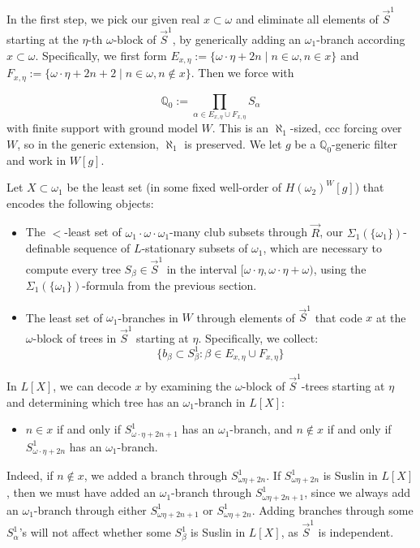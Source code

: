 \documentclass[a4paper,11pt]{article}
\newcommand{\forceQ}{\mathbb{Q}}
\begin{document}
{In the first step, we pick our given real $x \subset \omega$ and eliminate all elements of \(\vec{S}^1\) starting at the $\eta$-th $\omega$-block of \( \vec{S}^1 \), by generically adding an \(\omega_1\)-branch according  $x\subset \omega$. Specifically, we first form \(E_{x,\eta}:= \{ \omega \cdot \eta +2n \mid n \in \omega, n \in x \} \) and
\( F_{x,\eta} := \{ \omega \cdot \eta+2n+2 \mid n \in \omega, n \notin x \} \). Then we force with


 \[\forceQ_0:= \prod_{\alpha  \in E_{x,\eta} \cup F_{x,\eta}} S_{\alpha}\] with finite support with ground model \(W\). This is an \(\aleph_1\)-sized, ccc forcing over \(W\), so in the generic extension, \(\aleph_1\) is preserved. We let $g$ be a $\forceQ_0$-generic filter and work in $W[g]$.

 
Let \(X \subset \omega_1\) be the least set (in some fixed well-order of \(H(\omega_2)^W[g]\)) that encodes the following objects:
\begin{itemize}

\item  The $<$-least set of $\omega_1 \cdot \omega \cdot \omega_1$-many club subsets through $\vec{R}$, our $\Sigma_1 (\{\omega_1\})$-definable sequence of $L$-stationary subsets of $\omega_1$, which are necessary to compute every tree $S_{\beta} \in \vec{S}^1$ in the interval $[ \omega \cdot \eta, \omega\cdot \eta + \omega)$, using the $\Sigma_1 (\{\omega_1\})$-formula from the previous section.


\item The least set of \(\omega_1\)-branches in \(W\) through elements of \(\vec{S}^1\) that code \( x\) at the \(\omega\)-block of trees in $\vec{S}^1$ starting at  \( \eta \). Specifically, we collect:
\[
\{ b_{\beta} \subset S^1_{\beta} : \beta \in E_{x,\eta} \cup F_{x,\eta} \}
\]

\end{itemize}


In \(L[X]\),  we can decode \(x \) by examining the \(\omega\)-block of \(\vec{S}^1\)-trees starting at \(\eta\) and determining which tree has an \(\omega_1\)-branch in \(L[X]\):
\begin{itemize}
 \item[$(\ast)$]  $n \in x$ if and only if $S^1_{\omega \cdot \eta +2n+1}$ has an $\omega_1$-branch, and $n \notin x$ if and only if $S^1_{\omega \cdot \eta +2n}$ has an $\omega_1$-branch.
\end{itemize}
Indeed, if \(n \notin x\), we added a branch through \(S^1_{\omega \eta + 2n}\). If \(S^1_{\omega \eta + 2n}\) is Suslin in \(L[X]\), then we must have added an \(\omega_1\)-branch through \(S^1_{\omega \eta + 2n+1}\), since we always add an \(\omega_1\)-branch through either \(S^1_{\omega \eta + 2n+1}\) or \(S^1_{\omega \eta + 2n}\). Adding branches through some \(S^1_{\alpha}\)'s will not affect whether some \(S^1_{\beta}\) is Suslin in \(L[X]\), as \(\vec{S}^1\) is independent.

}
\end{document}

